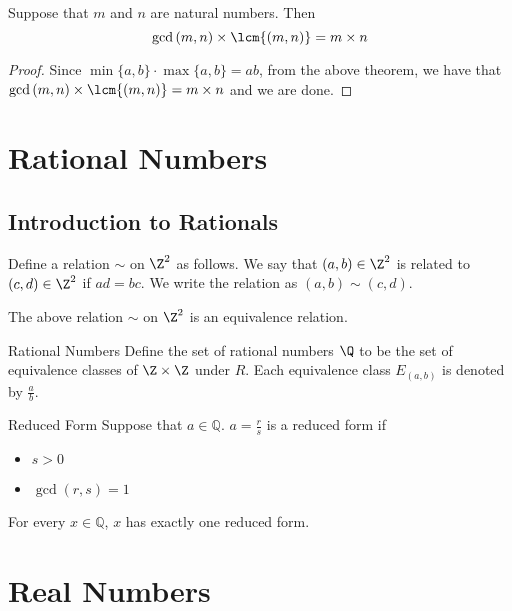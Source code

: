 \documentclass[a4paper]{article}
\begin{document}
\begin{prp}{}{} Suppose that $m$ and $n$ are natural numbers. Then $$\gcd{(m,n)}\times\lcm{(m,n)}=m\times n$$
\begin{proof} Since $\min\{a,b\}\cdot\max\{a,b\}=ab$, from the above theorem, we have that $\gcd{(m,n)}\times\lcm{(m,n)}=m\times n$ and we are done. 
\end{proof}
\end{prp}

\pagebreak
\section{Rational Numbers}
\subsection{Introduction to Rationals}
\begin{defn}{}{} Define a relation $\sim$ on $\Z^2$ as follows. We say that $(a,b)\in\Z^2$ is related to $(c,d)\in\Z^2$ if $ad=bc$. We write the relation as $(a,b)\sim(c,d)$. 
\end{defn}

\begin{lmm}{}{} The above relation $\sim$ on $\Z^2$ is an equivalence relation. 
\end{lmm}

\begin{defn}{Rational Numbers}{} Define the set of rational numbers $\Q$ to be the set of equivalence classes of $\Z\times\Z$ under $R$. Each equivalence class $E_{(a,b)}$ is denoted by $\frac{a}{b}$. 
\end{defn}

\begin{defn}{Reduced Form}{} Suppose that $a\in\mathbb{Q}$. $a=\frac{r}{s}$ is a reduced form if
\begin{itemize}
\item $s>0$
\item $\gcd{(r,s)}=1$
\end{itemize}
\end{defn}

\begin{thm}{}{} For every $x\in\mathbb{Q}$, $x$ has exactly one reduced form. 
\end{thm}

\pagebreak
\section{Real Numbers}
\end{document}
